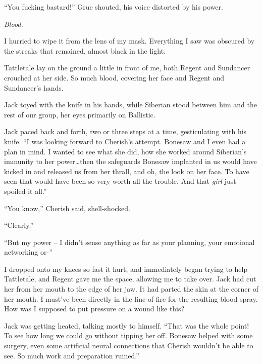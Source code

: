 ``You fucking bastard!'' Grue shouted, his voice distorted by his power.



\emph{Blood.}



I hurried to wipe it from the lens of my mask.  Everything I saw was obscured by the streaks that remained, almost black in the light.



Tattletale lay on the ground a little in front of me, both Regent and Sundancer crouched at her side.  So much blood, covering her face and Regent and Sundancer's hands.



Jack toyed with the knife in his hands, while Siberian stood between him and the rest of our group, her eyes primarily on Ballistic.



Jack paced back and forth, two or three steps at a time, gesticulating with his knife.  ``I was looking forward to Cherish's attempt.  Bonesaw and I even had a plan in mind.  I wanted to see what she did, how she worked around Siberian's immunity to her power\ldots then the safeguards Bonesaw implanted in us would have kicked in and released us from her thrall, and oh, the look on her face.  To have seen that would have been so very worth all the trouble.  And that \emph{girl} just spoiled it all.''



``You know,'' Cherish said, shell-shocked.



``Clearly.''



``But my power – I didn't sense anything as far as your planning, your emotional networking or-''



I dropped onto my knees so fast it hurt, and immediately began trying to help Tattletale, and Regent gave me the space, allowing me to take over.  Jack had cut her from her mouth to the edge of her jaw.  It had parted the skin at the corner of her mouth.  I must've been directly in the line of fire for the resulting blood spray.  How was I supposed to put pressure on a wound like this?



Jack was getting heated, talking mostly to himself.  ``That was the whole point!  To see how long we could go without tipping her off.  Bonesaw helped with some surgery, even some artificial neural connections that Cherish wouldn't be able to see.  So much work and preparation ruined.''



